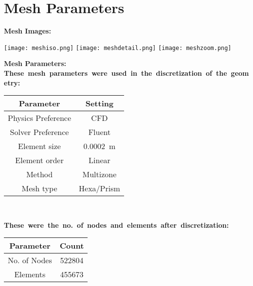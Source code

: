 \documentclass[twoside]{article}
\begin{document}
\section{Mesh Parameters}
\textbf{Mesh Images: }\\
\vspace{1.5cm}
\begin{center}
    \texttt{[image: meshiso.png]}
    \vspace{2cm}
    \texttt{[image: meshdetail.png]}
    \texttt{[image: meshzoom.png]}
\end{center}
\vspace{2cm}
\textbf{Mesh Parameters: }
\vspace{1.5cm}\\
\textbf{These\ mesh\ parameters\ were\ used\ in\ the\ discretization\ of\ the\ geometry:}
\vspace{0.25cm}
\begin{center}
\begin{tabular}{c  c}
\hline
    \textbf{Parameter} & \textbf{Setting} \\
    \hline
    Physics Preference & CFD\\
    Solver Preference & Fluent\\
    Element size & \SI{0.0002}{\meter}\\
    Element order & Linear\\
    Method & Multizone\\
    Mesh type & Hexa/Prism\\
    \hline
\end{tabular}\\
\end{center}
\vspace{1cm}
\textbf{These\ were\ the\ no.\ of\ nodes\ and\ elements\ after\ discretization:}   
\vspace{0.25cm}
\begin{center}
\begin{tabular}{c  c}
\hline
    \textbf{Parameter} & \textbf{Count} \\
    \hline
    No. of Nodes & 522804\\
    Elements & 455673\\
    \hline
\end{tabular}
\end{center}   
\vspace{1cm}
\newpage
\end{document}
